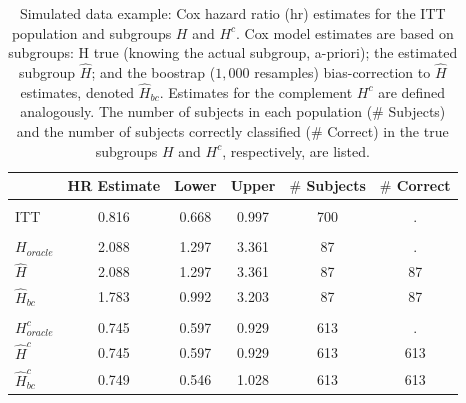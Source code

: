 \documentclass[smallextended]{svjour3}
\begin{document}
\begin{table}

\caption{\label{tab:simex_tab}\label{tab:simex} Simulated data example: Cox hazard ratio (hr) estimates for the ITT population and subgroups $H$ and $H^{c}$.
Cox model estimates are based on subgroups: H true (knowing the actual subgroup, a-priori); the estimated subgroup $\hat{H}$; and 
the boostrap ($1,000$ resamples) bias-correction to $\hat{H}$ estimates, denoted $\hat{H}_{bc}$.  Estimates for the complement $H^{c}$ are defined analogously.
The number of subjects in each population ($\#$ Subjects) and the number of subjects correctly classified ($\#$ Correct) in the true subgroups $H$ and $H^{c}$, respectively, are listed.}
\centering
\fontsize{9}{11}\selectfont
\begin{tabular}[t]{lccccc}
\toprule
  & HR Estimate & Lower & Upper & $\#$ Subjects & $\#$ Correct\\
\midrule
\addlinespace[0.3em]
\multicolumn{6}{l}{\textbf{ITT}}\\
\hspace{1em}ITT & 0.816 & 0.668 & 0.997 & 700 & .\\
\addlinespace[0.3em]
\multicolumn{6}{l}{\textbf{H subgroup estimates}}\\
\hspace{1em}$H_{oracle}$ & 2.088 & 1.297 & 3.361 & 87 & .\\
\hspace{1em}$\hat{H}$ & 2.088 & 1.297 & 3.361 & 87 & 87\\
\hspace{1em}$\hat{H}_{bc}$ & 1.783 & 0.992 & 3.203 & 87 & 87\\
\addlinespace[0.3em]
\multicolumn{6}{l}{\textbf{H-complement subgroup estimates}}\\
\hspace{1em}$H^{c}_{oracle}$ & 0.745 & 0.597 & 0.929 & 613 & .\\
\hspace{1em}$\hat{H}^{c}$ & 0.745 & 0.597 & 0.929 & 613 & 613\\
\hspace{1em}$\hat{H}^{c}_{bc}$ & 0.749 & 0.546 & 1.028 & 613 & 613\\
\bottomrule
\end{tabular}
\end{table}





\end{document}
